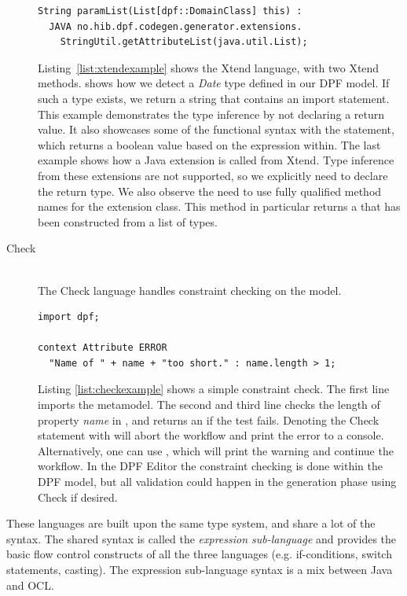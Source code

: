 \begin{description}
\begin{lstlisting}[showstringspaces=false]
String paramList(List[dpf::DomainClass] this) :
  JAVA no.hib.dpf.codegen.generator.extensions.
	StringUtil.getAttributeList(java.util.List);
  \end{lstlisting}
    Listing~\ref{list:xtendexample} shows the Xtend language, with two Xtend methods.  shows how we detect a \emph{Date} type defined in our DPF model. If such a type exists, we return a string that contains an import statement. This example demonstrates the type inference by not declaring a return value. It also showcases some of the functional syntax with the  statement, which returns a boolean value based on the expression within.
    The last example shows how a Java extension is called from Xtend. Type inference from these extensions are not supported, so we explicitly need to declare the return type. We also observe the need to use fully qualified method names for the extension class. This method in particular returns a  that has been constructed from a list of  types.
  \item[Check] \hfill \\
    The Check language handles constraint checking on the model.
\lstset{caption=Example showing a simple constraint check,label=list:checkexample,captionpos=b}
  \begin{lstlisting}[showstringspaces=false]
import dpf;

context Attribute ERROR
  "Name of " + name + "too short." : name.length > 1;
  \end{lstlisting}
    Listing \ref{list:checkexample} shows a simple constraint check. The first line imports the metamodel. The second and third line checks the length of property \emph{name} in , and returns an  if the test fails. Denoting the Check statement with  will abort the workflow and print the error to a console. Alternatively, one can use , which will print the warning and continue the workflow.
    In the DPF Editor the constraint checking is done within the DPF model, but all validation could happen in the generation phase using Check if desired.
\end{description}
These languages are built upon the same type system, and share a lot of the syntax. The shared syntax is called the \emph{expression sub-language} and provides the basic flow control constructs of all the three languages (e.g. if-conditions, switch statements, casting). The expression sub-language syntax is a mix between Java and OCL.

